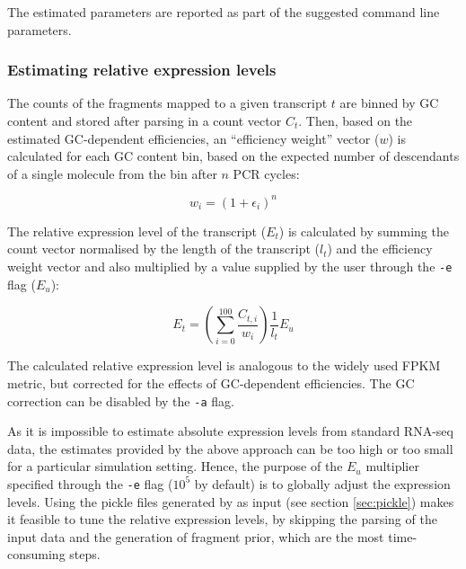 The estimated parameters are reported as part of the suggested \rlsim command line parameters.

\subsubsection{Estimating relative expression levels}

The counts of the fragments mapped to a given transcript $t$ are binned by GC content and stored after parsing in a count vector $C_t$.
Then, based on the estimated GC-dependent efficiencies, an ``efficiency weight'' vector ($w$) is calculated for each GC content bin, based on the expected number of descendants of a single molecule from the bin after $n$ PCR cycles:

\begin{equation}
    w_i = \left(1+\epsilon_i\right)^n
\end{equation}

The relative expression level of the transcript ($E_t$) is calculated by summing the count vector normalised by the length of the transcript ($l_t$) and the efficiency weight vector and also multiplied by a value supplied by the user through the \texttt{-e} flag ($E_u$):

\begin{equation}
    E_t = \left( \sum_{i=0}^{100} \frac{C_{t,i}}{w_i} \right) \frac{1}{l_t} E_u
\end{equation}

The calculated relative expression level is analogous to the widely used FPKM metric, but corrected for the effects of GC-dependent efficiencies.
The GC correction can be disabled by the \texttt{-a} flag.

As it is impossible to estimate absolute expression levels from standard RNA-seq data, the estimates provided by the above approach can be too high or too small for a particular simulation setting. Hence, the purpose of the $E_u$ multiplier specified through the \texttt{-e} flag ($10^5$ by default) is to globally adjust the expression levels. Using the pickle files generated by \effest as input (see section \ref{sec:pickle}) makes it feasible to tune the relative expression levels, by skipping the parsing of the input data and the generation of fragment prior, which are the most time-consuming steps.


